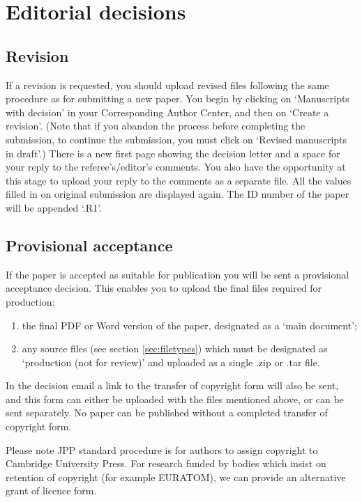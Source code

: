 \documentclass[12pt]{RBM_P}
\begin{document}
\section{Editorial decisions}

\subsection{Revision}
If a revision is requested, you should upload revised files following the same procedure as for submitting a new paper. You begin by clicking on `Manuscripts with decision' in your Corresponding Author Center, and then on `Create a revision'. (Note that if you abandon the process before completing the submission, to continue the submission, you must click on `Revised manuscripts in draft'.) There is a new first page showing the decision letter and a space for your reply to the referee's/editor's comments. You also have the opportunity at this stage to upload your reply to the comments as a separate file. All the values filled in on original submission are displayed again. The ID number of the paper will be appended `.R1'.

\subsection{Provisional acceptance}
If the paper is accepted as suitable for publication you will be sent a provisional acceptance decision. This enables you to upload the final files required for production:
\begin{enumerate}
\item the final PDF or Word version of the paper, designated as a `main document';
\item any source files (see section \ref{sec:filetypes}) which must be designated as `production (not for review)' and uploaded as a single .zip or .tar file.
\end{enumerate}

In the decision email a link to the transfer of copyright form will also be sent, and this form can either be uploaded with the files mentioned above, or can be sent separately. No paper can be published without a completed transfer of copyright form.

Please note JPP standard procedure is for authors to assign copyright to Cambridge University Press. For research funded by bodies which insist on retention of copyright (for example EURATOM), we can provide an alternative grant of licence form. 
\end{document}
